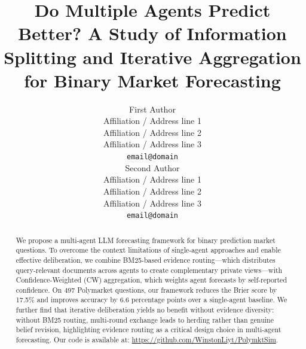 \documentclass[11pt]{article}
\title{Do Multiple Agents Predict Better? A Study of Information Splitting and Iterative Aggregation for Binary Market Forecasting}
\author{First Author \\
  Affiliation / Address line 1 \\
  Affiliation / Address line 2 \\
  Affiliation / Address line 3 \\
  \texttt{email@domain} \\\And
  Second Author \\
  Affiliation / Address line 1 \\
  Affiliation / Address line 2 \\
  Affiliation / Address line 3 \\
  \texttt{email@domain} \\}
\theoremstyle{definition}          %
\begin{document}
\maketitle
\begin{abstract}
We propose a multi-agent LLM forecasting framework for binary prediction market questions.
To overcome the context limitations of single-agent approaches and enable effective
deliberation, we combine BM25-based evidence routing---which distributes query-relevant
documents across agents to create complementary private views---with Confidence-Weighted
(CW) aggregation, which weights agent forecasts by self-reported confidence.
On 497 Polymarket questions, our framework reduces the Brier score by 17.5\% and improves
accuracy by 6.6 percentage points over a single-agent baseline.
We further find that iterative deliberation yields no benefit without evidence diversity:
without BM25 routing, multi-round exchange leads to herding rather than genuine belief revision,
highlighting evidence routing as a critical design choice in multi-agent forecasting.
Our code is available at: \url{https://github.com/WinstonLiyt/PolymktSim}.
\end{abstract}

\end{document}
